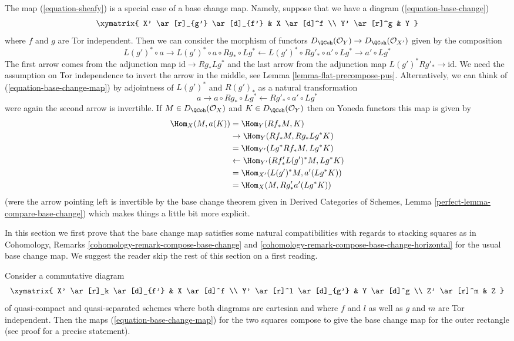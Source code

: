 \noindent
The map (\ref{equation-sheafy}) is a special case of a base change map.
Namely, suppose that we have a diagram (\ref{equation-base-change})
$$
\xymatrix{
X' \ar[r]_{g'} \ar[d]_{f'} & X \ar[d]^f \\
Y' \ar[r]^g & Y
}
$$
where $f$ and $g$ are Tor independent. Then we can consider the
morphism of functors
$D_\QCoh(\mathcal{O}_Y) \to D_\QCoh(\mathcal{O}_{X'})$
given by the composition
\begin{equation}
\label{equation-base-change-map}
L(g')^* \circ a \to
L(g')^* \circ a \circ Rg_* \circ Lg^* \leftarrow
L(g')^* \circ Rg'_* \circ a' \circ Lg^* \to a' \circ Lg^*
\end{equation}
The first arrow comes from the adjunction map $\text{id} \to Rg_* Lg^*$
and the last arrow from the adjunction map $L(g')^*Rg'_* \to \text{id}$.
We need the assumption on Tor independence to invert the arrow
in the middle, see Lemma \ref{lemma-flat-precompose-pus}.
Alternatively, we can think of (\ref{equation-base-change-map}) by
adjointness of $L(g')^*$ and $R(g')_*$ as a natural transformation
$$
a \to a \circ Rg_* \circ Lg^* \leftarrow Rg'_* \circ a' \circ Lg^*
$$
were again the second arrow is invertible. If $M \in D_\QCoh(\mathcal{O}_X)$
and $K \in D_\QCoh(\mathcal{O}_Y)$
then on Yoneda functors this map is given by
\begin{align*}
\Hom_X(M, a(K))
& =
\Hom_Y(Rf_*M, K) \\
& \to
\Hom_Y(Rf_*M, Rg_* Lg^*K) \\
& =
\Hom_{Y'}(Lg^*Rf_*M, Lg^*K) \\
& \leftarrow
\Hom_{Y'}(Rf'_* L(g')^*M, Lg^*K) \\
& =
\Hom_{X'}(L(g')^*M, a'(Lg^*K)) \\
& =
\Hom_X(M, Rg'_*a'(Lg^*K))
\end{align*}
(were the arrow pointing left is invertible by the base
change theorem given in
Derived Categories of Schemes, Lemma \ref{perfect-lemma-compare-base-change})
which makes things a little bit more explicit.

\medskip\noindent
In this section we first prove that the base change map satisfies
some natural compatibilities with regards to stacking squares as in
Cohomology, Remarks \ref{cohomology-remark-compose-base-change} and
\ref{cohomology-remark-compose-base-change-horizontal} for the usual
base change map. We suggest the reader skip the rest of this section
on a first reading.

\begin{lemma}
\label{lemma-compose-base-change-maps}
Consider a commutative diagram
$$
\xymatrix{
X' \ar[r]_k \ar[d]_{f'} & X \ar[d]^f \\
Y' \ar[r]^l \ar[d]_{g'} & Y \ar[d]^g \\
Z' \ar[r]^m & Z
}
$$
of quasi-compact and quasi-separated schemes where
both diagrams are cartesian and where $f$ and $l$
as well as $g$ and $m$ are Tor independent.
Then the maps (\ref{equation-base-change-map})
for the two squares compose to give the base
change map for the outer rectangle (see proof for a precise statement).
\end{lemma}

